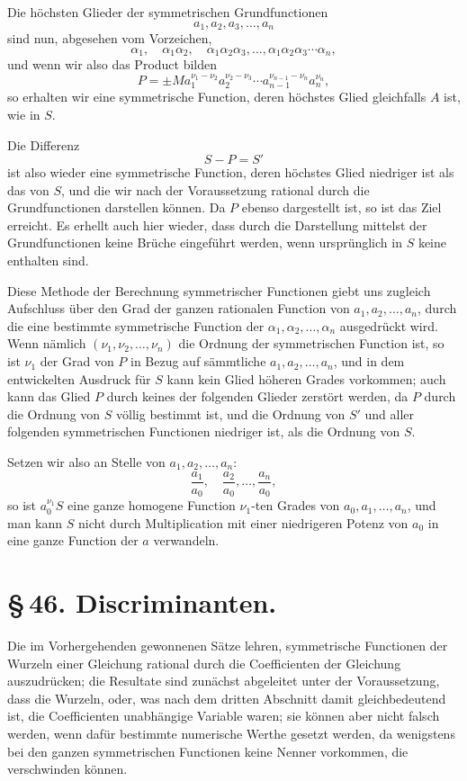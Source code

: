 \documentclass[11pt]{article}
\begin{document}
Die höchsten Glieder der symmetrischen Grundfunctionen
\[
 a_1,a_2,a_3,\ldots,a_n
\]
sind nun, abgesehen vom Vorzeichen,
\[
 \alpha_1,\quad \alpha_1\alpha_2,\quad \alpha_1\alpha_2\alpha_3,\ldots,\alpha_1\alpha_2\alpha_3\cdots\alpha_n,
\]
und wenn wir also das Product bilden
\[
 P=\pm M a_1^{\nu_1-\nu_2}a_2^{\nu_2-\nu_3}\cdots a_{n-1}^{\nu_{n-1}-\nu_n}a_n^{\nu_n},
\]
so erhalten wir eine symmetrische Function, deren höchstes Glied gleichfalls \(A\) ist, wie in \(S\).

Die Differenz
\[
 S-P=S'
\]
ist also wieder eine symmetrische Function, deren höchstes Glied niedriger ist als das von \(S\), und die wir nach der Voraussetzung rational durch die Grundfunctionen darstellen können. Da \(P\) ebenso dargestellt ist, so ist das Ziel erreicht. Es erhellt auch hier wieder, dass durch die Darstellung mittelst der Grundfunctionen keine Brüche eingeführt werden, wenn ursprünglich in \(S\) keine enthalten sind.

Diese Methode der Berechnung symmetrischer Functionen giebt uns zugleich Aufschluss über den Grad der ganzen rationalen Function von \(a_1,a_2,\ldots,a_n\), durch die eine bestimmte symmetrische Function der \(\alpha_1,\alpha_2,\ldots,\alpha_n\) ausgedrückt wird. Wenn nämlich \((\nu_1,\nu_2,\ldots,\nu_n)\) die Ordnung der symmetrischen Function ist, so ist \(\nu_1\) der Grad von \(P\) in Bezug auf sämmtliche \(a_1,a_2,\ldots,a_n\), und in dem entwickelten Ausdruck für \(S\) kann kein Glied höheren Grades vorkommen; auch kann das Glied \(P\) durch keines der folgenden Glieder zerstört werden, da \(P\) durch die Ordnung von \(S\) völlig bestimmt ist, und die Ordnung von \(S'\) und aller folgenden symmetrischen Functionen niedriger ist, als die Ordnung von \(S\).

Setzen wir also an Stelle von \(a_1,a_2,\ldots,a_n\):
\[
 \frac{a_1}{a_0},\quad \frac{a_2}{a_0},\ldots,\frac{a_n}{a_0},
\]
so ist \(a_0^{\nu_1}S\) eine ganze homogene Function \(\nu_1\)-ten Grades von \(a_0,a_1,\ldots,a_n\), und man kann \(S\) nicht durch Multiplication mit einer niedrigeren Potenz von \(a_0\) in eine ganze Function der \(a\) verwandeln.

\section*{\S\,46. Discriminanten.}

Die im Vorhergehenden gewonnenen Sätze lehren, symmetrische Functionen der Wurzeln einer Gleichung rational durch die Coefficienten der Gleichung auszudrücken; die Resultate sind zunächst abgeleitet unter der Voraussetzung, dass die Wurzeln, oder, was nach dem dritten Abschnitt damit gleichbedeutend ist, die Coefficienten unabhängige Variable waren; sie können aber nicht falsch werden, wenn dafür bestimmte numerische Werthe gesetzt werden, da wenigstens bei den ganzen symmetrischen Functionen keine Nenner vorkommen, die verschwinden können.
\end{document}
